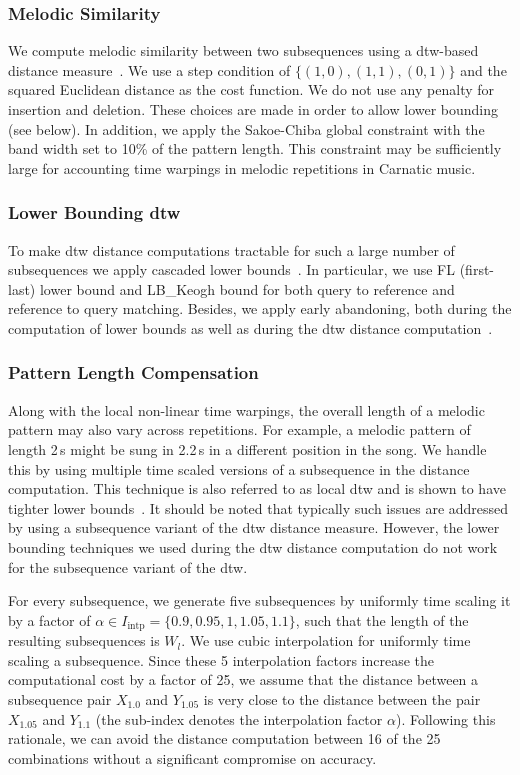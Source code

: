 \subsubsection{Melodic Similarity}
\label{MelodicSimilarity}
We compute melodic similarity between two subsequences using a \gls{dtw}-based distance measure~\cite{Sakoe78TASLP}. We use a step condition of $\lbrace(1,0), (1,1), (0,1)\rbrace$ and the squared Euclidean distance as the cost function. We do not use any penalty for insertion and deletion. These choices are made in order to allow lower bounding (see below). In addition, we apply the Sakoe-Chiba global constraint with the band width set to 10\% of the pattern length. This constraint may be sufficiently large for accounting time warpings in melodic repetitions in Carnatic music.

\subsubsection{Lower Bounding \gls{dtw}}
\label{LowerBoundingDTW}
To make \gls{dtw} distance computations tractable for such a large number of subsequences we apply cascaded lower bounds~\cite{Rakthanmanon2013}. In particular, we use FL (first-last) lower bound and LB\_Keogh bound for both query to reference and reference to query matching. Besides, we apply early abandoning, both during the computation of lower bounds as well as during the \gls{dtw} distance computation~\cite{Rakthanmanon2013}. 

\subsubsection{Pattern Length Compensation}
\label{PatternLengthCompensation}
Along with the local non-linear time warpings, the overall length of a melodic pattern may also vary across repetitions. For example, a melodic pattern of length 2\,s might be sung in 2.2\,s in a different position in the song. We handle this by using multiple time scaled versions of a subsequence in the distance computation. This technique is also referred to as local \gls{dtw} and is shown to have tighter lower bounds~\cite{Zhu2003}. It should be noted that typically such issues are addressed by using a subsequence variant of the \gls{dtw} distance measure. However, the lower bounding techniques we used during the \gls{dtw} distance computation do not work for the subsequence variant of the \gls{dtw}. 

For every subsequence, we generate five subsequences by uniformly time scaling it by a factor of $\alpha \in I_{\text{intp}} =\lbrace 0.9, 0.95, 1, 1.05, 1.1\rbrace$, such that the length of the resulting subsequences is $W_l$. We use cubic interpolation for uniformly time scaling a subsequence. Since these 5 interpolation factors increase the computational cost by a factor of 25, we assume that the distance between a subsequence pair $X_{1.0}$ and $Y_{1.05}$ is very close to the distance between the pair $X_{1.05}$ and $Y_{1.1}$ (the sub-index denotes the interpolation factor $\alpha$). Following this rationale, we can avoid the distance computation between 16 of the 25 combinations without a significant compromise on accuracy.

